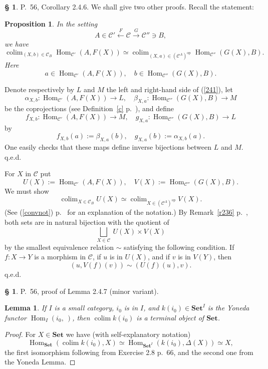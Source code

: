 \documentclass[12pt]{article}
\newtheorem{lem}[thm]{Lemma}
\newtheorem{prop}[thm]{Proposition}
\theoremstyle{remark}
\theoremstyle{definition}
\newtheorem{s}[thm]{\S}
\newcommand{\C}{\mathcal C}
\newcommand{\Set}{\mathbf{Set}}
\newcommand{\mv}{ (minor variant)}
\newcommand{\cn}{(See (\ref{convnot}) p.~\pageref{convnot} for an explanation of the notation.) }
\DeclareMathOperator*{\coli}{colim}
\DeclareMathOperator*{\co}{colim}
\DeclareMathOperator{\Hom}{Hom}%
\DeclareMathOperator{\op}{op}
\begin{document}
%
%
\begin{s} 
P.~56, Corollary 2.4.6. We shall give two other proofs. Recall the statement: 
%
\begin{prop} 
In the setting 
%
\begin{equation}\label{241s}
A\in\C'\xleftarrow{F}\C\xrightarrow{G}\C''\ni B, 
\end{equation} 
%
we have 
%
\begin{equation}\label{241} 
\coli_{(X,b)\in\C_B}\Hom_{\C'}(A,F(X))\simeq 
\coli_{(X,a)\in(\C^A)^{\op}}\Hom_{\C''}(G(X),B). 
\end{equation} 
%
Here 
$$
a\in\Hom_{\C'}(A,F(X)),\quad b\in\Hom_{\C''}(G(X),B). 
$$ 
\end{prop}
%
 Denote respectively by $L$ and $M$ the left and right-hand side of (\ref{241}), let 
$$
\alpha_{X,b}:\Hom_{\C'}(A,F(X))\to L,\quad\beta_{X,a}:\Hom_{\C''}(G(X),B)\to M
$$
be the coprojections (see Definition~\ref{c} p.~\pageref{c}), and define 
$$
f_{X,b}:\Hom_{\C'}(A,F(X))\to M,\quad g_{X,a}:\Hom_{\C''}(G(X),B)\to L
$$
by
$$
f_{X,b}(a):=\beta_{X,a}(b),\quad g_{X,a}(b):=\alpha_{X,b}(a).
$$
One easily checks that these maps define inverse bijections between $L$ and $M$. q.e.d. 

 For $X$ in $\C$ put 
%
\begin{equation}\label{p2}
U(X):=\Hom_{\C'}(A,F(X)),\quad V(X):=\Hom_{\C''}(G(X),B). 
\end{equation}
%
We must show 
$$
\co_{X\in\C_B}U(X)\simeq\co_{X\in(\C^A)^{\op}}V(X). 
$$ 
\cn By Remark~\ref{r236} p.~\pageref{r236}, both sets are in natural bijection with the quotient of 
$$
\bigsqcup_{X\in\C}\ U(X)\times V(X) 
$$ 
by the smallest equivalence relation $\sim$ satisfying the following condition. If $f:X\to Y$ is a morphism in $\C$, if $u$ is in $U(X)$, and if $v$ is in $V(Y)$, then 
$$
(u,V(f)(v))\sim(U(f)(u),v). 
$$ 
q.e.d.
\end{s}
%
%
\begin{s} 
P.~56, proof of Lemma 2.4.7\mv.
%
\begin{lem} 
If $I$ is a small category, $i_0$ is in $I$, and $k(i_0)\in\Set^I$ is the Yoneda functor $\Hom_I(i_0,\ )$, then $\coli k(i_0)$ is a terminal object of $\Set$. 
\end{lem}
%
\begin{proof}
For $X\in\Set$ we have (with self-explanatory notation)
$$
\Hom_{\Set}\left(\coli k(i_0),X\right)\simeq\Hom_{{\Set}^I}(k(i_0),\Delta(X))\simeq X,
$$
the first isomorphism following from Exercise 2.8 p.~66, and the second one from the Yoneda Lemma.
\end{proof}
\end{s}
\end{document}
